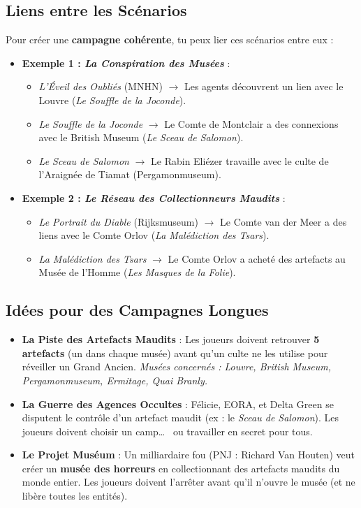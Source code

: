 \documentclass[10pt,a5paper,twoside]{book}
\begin{document}
\subsection{Liens entre les Scénarios}
Pour créer une \textbf{campagne cohérente}, tu peux lier ces scénarios entre eux :
\begin{itemize}
\item \textbf{Exemple 1 : \textit{La Conspiration des Musées}} :
	\begin{itemize}
		\item \textit{L'Éveil des Oubliés} (MNHN) $\rightarrow$ Les agents découvrent un lien avec le Louvre (\textit{Le Souffle de la Joconde}).
		\item \textit{Le Souffle de la Joconde} $\rightarrow$ Le Comte de Montclair a des connexions avec le British Museum (\textit{Le Sceau de Salomon}).
		\item \textit{Le Sceau de Salomon} $\rightarrow$ Le Rabin Eliézer travaille avec le culte de l'Araignée de Tiamat (Pergamonmuseum).
	\end{itemize}

\item \textbf{Exemple 2 : \textit{Le Réseau des Collectionneurs Maudits}} :
	\begin{itemize}
		\item \textit{Le Portrait du Diable} (Rijksmuseum) $\rightarrow$ Le Comte van der Meer a des liens avec le Comte Orlov (\textit{La Malédiction des Tsars}).
		\item \textit{La Malédiction des Tsars} $\rightarrow$ Le Comte Orlov a acheté des artefacts au Musée de l'Homme (\textit{Les Masques de la Folie}).
	\end{itemize}
\end{itemize}

\subsection{Idées pour des Campagnes Longues}
\begin{itemize}
\item \textbf{La Piste des Artefacts Maudits} :
	Les joueurs doivent retrouver \textbf{5 artefacts} (un dans chaque musée) avant qu'un culte ne les utilise pour réveiller un Grand Ancien. \emph{Musées concernés : Louvre, British Museum, Pergamonmuseum, Ermitage, Quai Branly. }

\item \textbf{La Guerre des Agences Occultes} :
	Félicie, EORA, et Delta Green se disputent le contrôle d'un artefact maudit (ex : le \textit{Sceau de Salomon}).
	Les joueurs doivent choisir un camp\ldots~  ou travailler en secret pour tous.

\item \textbf{Le Projet Muséum} :
	Un milliardaire fou (PNJ : Richard Van Houten) veut créer un \textbf{musée des horreurs} en collectionnant des artefacts maudits du monde entier.
	Les joueurs doivent l'arrêter avant qu'il n'ouvre le musée (et ne libère toutes les entités).
\end{itemize}
\end{document}
